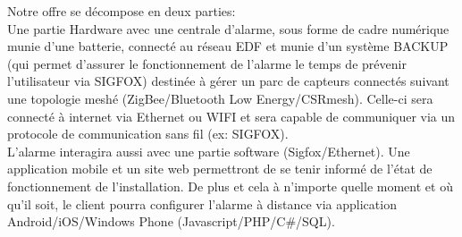 Notre offre se décompose en deux parties:\\
Une partie Hardware avec une centrale d'alarme, sous forme de cadre numérique munie d'une batterie, connecté au réseau EDF et munie d'un système BACKUP (qui permet d'assurer le fonctionnement de l'alarme le temps de prévenir l'utilisateur via SIGFOX) destinée à gérer un parc de capteurs connectés suivant une topologie meshé (ZigBee/Bluetooth Low Energy/CSRmesh). Celle-ci sera connecté à internet via Ethernet ou WIFI et sera capable de communiquer via un protocole de communication sans fil (ex: SIGFOX).\\
L'alarme interagira aussi avec une partie software (Sigfox/Ethernet). Une application mobile et un site web permettront de se tenir informé de l'état de fonctionnement de l'installation. De plus et cela à n'importe quelle moment et où qu'il soit, le client pourra configurer l'alarme à distance via application Android/iOS/Windows Phone (Javascript/PHP/C\#/SQL).